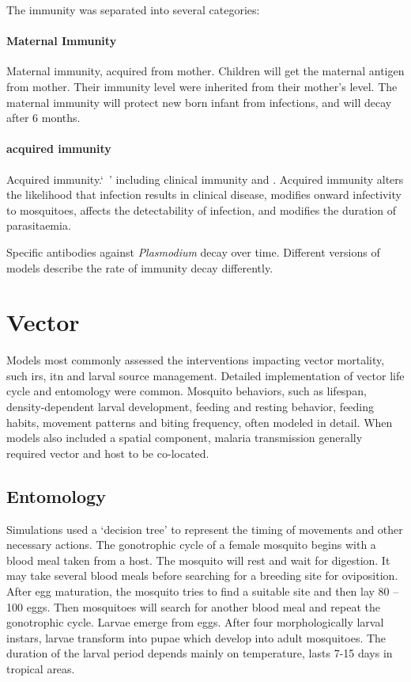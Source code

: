 \documentclass[a4paper, 12pt, twoside]{article}
\begin{document}
The immunity was separated into several categories:

\paragraph{Maternal Immunity}%
\label{par:maternal_immunity}
Maternal immunity, acquired from mother. Children will get the maternal antigen from mother. Their immunity level were inherited from their mother's level. The maternal immunity will protect new born infant from infections, and will decay after 6 months.

\paragraph{acquired immunity}%
\label{par:acquired_immunity}
Acquired immunity.`\ ' including clinical immunity and .
Acquired immunity alters the likelihood that infection results in clinical disease, modifies onward infectivity to mosquitoes, affects the detectability of infection, and modifies the duration of parasitaemia.

Specific antibodies against \textit{Plasmodium} decay over time.
Different versions of models describe the rate of immunity decay differently.


\section{Vector}%
\label{sec:vector}
Models most commonly assessed the interventions impacting vector mortality, such \gls{irs}, \gls{itn} and larval source management.
Detailed implementation of vector life cycle and entomology were common.
Mosquito behaviors, such as lifespan, density-dependent larval development, feeding and resting behavior, feeding habits, movement patterns and biting frequency, often modeled in detail.
When models also included a spatial component, malaria transmission generally required vector and host to be co-located.

\subsection{Entomology}
Simulations used a ‘decision tree’ to represent the timing of movements and other necessary actions.
The gonotrophic cycle of a female mosquito begins with a blood meal taken from a host.
The mosquito will rest and wait for digestion.
It may take several blood meals before searching for a breeding site for oviposition.
After egg maturation, the mosquito tries to find a suitable site and then lay 80 – 100 eggs.
Then mosquitoes will search for another blood meal and repeat the gonotrophic cycle.
Larvae emerge from eggs.
After four morphologically larval instars, larvae transform into pupae which develop into adult mosquitoes.
The duration of the larval period depends mainly on temperature, lasts 7-15 days in tropical areas.
\end{document}
